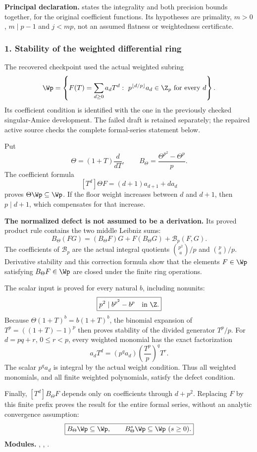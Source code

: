 \textbf{Principal declaration.}  states the integrality and both precision bounds together, for the original coefficient functions. Its hypotheses are primality, $m>0$, $m\mid p-1$ and $j<mp$, not an assumed flatness or weightedness certificate.
\par\medskip
\subsubsection*{1. Stability of the weighted differential ring}
The recovered checkpoint used the actual weighted subring
\[
 \Wp=\left\{F(T)=\sum_{d\ge0}a_dT^d:\
 p^{\lfloor d/p\rfloor}a_d\in\Z_p\ \text{for every }d\right\}.
\]
Its coefficient condition is identified with the one in the previously checked singular-Amice development. The failed  draft is retained separately; the repaired active source checks the complete formal-series statement below.

Put
\[
 \Theta=(1+T)\frac{d}{dT},\qquad
 B_\Theta=\frac{\Theta^{p^2}-\Theta^p}{p}.
\]
The coefficient formula
\[
 [T^d]\Theta F=(d+1)a_{d+1}+da_d
\]
proves $\Theta\Wp\subseteq\Wp$. If the floor weight increases between $d$ and $d+1$, then $p\mid d+1$, which compensates for that increase.

\textbf{The normalized defect is not assumed to be a derivation.}
Its proved product rule contains the two middle Leibniz sums:
\[
 B_\Theta(FG)=(B_\Theta F)G+F(B_\Theta G)+\mathcal B_p(F,G).
\]
The coefficients of $\mathcal B_p$ are the actual integral quotients
$\binom{p^2}{a}/p$ and $\binom pa/p$. Derivative stability and this correction formula show that the elements $F\in\Wp$ satisfying $B_\Theta F\in\Wp$ are closed under the finite ring operations.

The scalar input is proved for every natural $b$, including nonunits:
\[
 \boxed{p^2\mid b^{p^2}-b^p\quad\text{in }\Z.}
\]
Because $\Theta(1+T)^b=b(1+T)^b$, the binomial expansion of $T^p=((1+T)-1)^p$ then proves stability of the divided generator $T^p/p$. For $d=pq+r$, $0\le r<p$, every weighted monomial has the exact factorization
\[
 a_dT^d=(p^qa_d)\left(\frac{T^p}{p}\right)^qT^r.
\]
The scalar $p^qa_d$ is integral by the actual weight condition. Thus all weighted monomials, and all finite weighted polynomials, satisfy the defect condition.

Finally, $[T^d]B_\Theta F$ depends only on coefficients through $d+p^2$. Replacing $F$ by this finite prefix proves the result for the entire formal series, without an analytic convergence assumption:
\[
 \boxed{B_\Theta\Wp\subseteq\Wp,\qquad B_\Theta^s\Wp\subseteq\Wp\ (s\ge0).}
\]
\textbf{Modules.} , , .
\par\medskip
